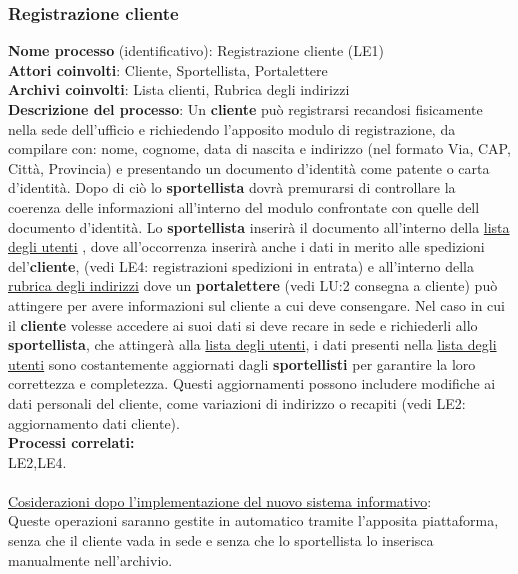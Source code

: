 \documentclass[a4paper,12pt]{article}
\begin{document}
\subsubsection{Registrazione cliente}
\textbf{Nome processo} (identificativo): Registrazione cliente (LE1) \\
\textbf{Attori coinvolti}: Cliente, Sportellista, Portalettere \\
\textbf{Archivi coinvolti}: Lista clienti, Rubrica degli indirizzi\\ 
\textbf{Descrizione del processo}: Un \textbf{cliente} può registrarsi recandosi fisicamente nella sede dell'ufficio e richiedendo l'apposito modulo di registrazione, 
da compilare con: nome, cognome, data di nascita e indirizzo (nel formato Via, CAP, Città, Provincia) e presentando un documento d'identità come patente o carta d'identità. 
Dopo di ciò lo \textbf{sportellista} dovrà premurarsi di controllare la coerenza delle informazioni all'interno del modulo confrontate con quelle dell documento d'identità. 
Lo \textbf{sportellista} inserirà il documento all'interno della \underline{lista degli utenti} , dove all'occorrenza inserirà anche i dati in merito alle spedizioni 
del'\textbf{cliente}, (vedi LE4: registrazioni spedizioni in entrata) e all'interno della \underline{rubrica degli indirizzi} dove un \textbf{portalettere} 
(vedi LU:2 consegna a cliente) può attingere per avere informazioni sul cliente a cui deve consengare.  Nel caso in cui il \textbf{cliente} volesse accedere ai 
suoi dati si deve recare in sede e richiederli allo \textbf{sportellista}, che attingerà alla \underline{lista degli utenti}, i dati presenti nella 
\underline{lista degli utenti} sono costantemente aggiornati dagli \textbf{sportellisti} per garantire la loro correttezza e completezza. 
Questi aggiornamenti possono includere modifiche ai dati personali del cliente, come variazioni di indirizzo o recapiti (vedi LE2: aggiornamento dati cliente). \\
\textbf{Processi correlati:}\\LE2,LE4.\\ \\
\underline{Cosiderazioni dopo l'implementazione del nuovo sistema informativo}: \\ Queste operazioni saranno gestite in automatico tramite l'apposita piattaforma, 
senza che il cliente vada in sede e senza che lo sportellista lo inserisca manualmente nell'archivio.
\end{document}

